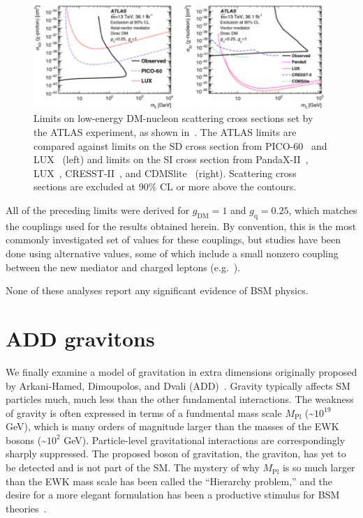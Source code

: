 \documentclass[oneside, letterpaper, 12pt, oldfontcommands]{memoir}
\begin{document}
\begin{figure}[hbtb]
  \begin{center}
    \includegraphics[width=0.98\textwidth]{Figures/dmsimp_dd_atlas.png}
    \caption{Limits on low-energy DM-nucleon scattering cross sections set by the ATLAS experiment, as shown in~\cite{ref:epjc/s10052-017-4965-8}. The ATLAS
    limits are compared against limits on the SD cross section from PICO-60~\cite{ref:PICO60-ATLAS} and LUX~\cite{ref:LUX-SD-ATLAS} (left)
    and limits on the SI cross section from PandaX-II~\cite{ref:PANDAX-II-ATLAS}, LUX~\cite{ref:LUX-SI-ATLAS}, CRESST-II~\cite{ref:CRESST-II-ATLAS}, and CDMSlite~\cite{ref:SuperCDMS-ATLAS} (right).
    Scattering cross sections are excluded at 90\% CL or more above the contours.
    }
    \label{fig:dmsimp_dd_atlas}
  \end{center}
\end{figure}

All of the preceding limits were derived for $g_\mathrm{DM} = 1$ and $g_\mathrm{q} = 0.25$, which matches the couplings used for the results obtained herein.
By convention, this is the most commonly investigated set of values for these couplings, but studies have been done using alternative values, some of which
include a small nonzero coupling between the new mediator and charged leptons (e.g.~\cite{ref:epjc/s10052-017-4965-8}).

None of these analyses report any significant evidence of BSM physics.

\section{ADD gravitons} \label{sec:introduction_ADD}
We finally examine a model of gravitation in extra dimensions originally proposed by Arkani-Hamed, Dimoupolos, and Dvali (ADD)~\cite{ref:S0370-2693(98)00466-3}.
Gravity typically affects SM particles much, much less than the other fundamental interactions. The weakness of gravity
is often expressed in terms of a fundmental mass scale $M_\mathrm{Pl}$ (\textasciitilde$10^{19}$ GeV), which is
many orders of magnitude larger than the masses of the EWK bosons (\textasciitilde$10^{2}$ GeV). Particle-level gravitational interactions
are correspondingly sharply suppressed. The proposed boson of gravitation, the graviton, has yet to be detected and is not part of the SM.
The mystery of why $M_\mathrm{Pl}$ is so much larger than the EWK mass scale has been called the ``Hierarchy problem,'' and the desire for a
more elegant formulation has been a productive stimulus for BSM theories~\cite{ref:S0370-2693(98)00466-3, ref:0264-9381/32/3/033001}.
\end{document}
